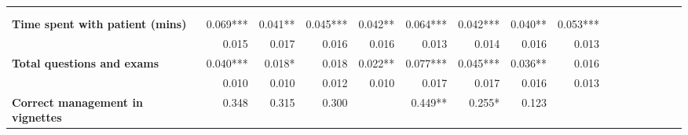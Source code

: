 \begin{tabular}{@{\extracolsep{5pt}}lrrrrrrrrrrrrrrr}
\toprule
&  &  &  &  &  &  &  &  \\
{\bf } &  &  &  &  &  &  &  &  \\
\hline
{\bf Time spent with patient (mins)} & 0.069*** & 0.041**\phantom{*} & 0.045*** & 0.042**\phantom{*} & 0.064*** & 0.042*** & 0.040**\phantom{*} & 0.053*** \\
{\bf } & 0.015\phantom{***} & 0.017\phantom{***} & 0.016\phantom{***} & 0.016\phantom{***} & 0.013\phantom{***} & 0.014\phantom{***} & 0.016\phantom{***} & 0.013\phantom{***} \\
{\bf Total questions and exams} & 0.040*** & 0.018*\phantom{**} & 0.018\phantom{***} & 0.022**\phantom{*} & 0.077*** & 0.045*** & 0.036**\phantom{*} & 0.016\phantom{***} \\
{\bf } & 0.010\phantom{***} & 0.010\phantom{***} & 0.012\phantom{***} & 0.010\phantom{***} & 0.017\phantom{***} & 0.017\phantom{***} & 0.016\phantom{***} & 0.013\phantom{***} \\
{\bf Correct management in vignettes} & 0.348\phantom{***} & 0.315\phantom{***} & 0.300\phantom{***} & \phantom{***} & 0.449**\phantom{*} & 0.255*\phantom{**} & 0.123\phantom{***} & \phantom{***} \\

\end{tabular}
